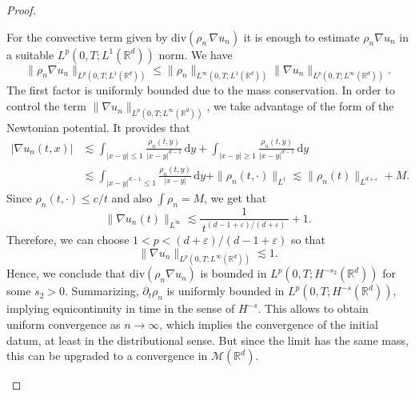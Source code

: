 \documentclass[11pt,a4paper]{article}
\numberwithin{equation}{section}
\newcommand{\R}{{\mathbb{R}}}
\theoremstyle{plain}
\theoremstyle{remark}
\newcommand {\f}{\frac}
\newcommand {\Div}{ {\rm div} }
\begin{document}
\begin{proof}
\begin{enumeratesteps}
For the convective term given by $\mathrm{div}(\rho_n\,\nabla u_n)$ it is enough to estimate $\rho_n \nabla u_n$ in a suitable $L^p(0,T; L^1(\R^d))$ norm.  We have
\[
\|\rho_n\nabla u_n\|_{L^p(0,T;L^1(\mathbb{R}^d))}
   \le  
\|\rho_n\|_{L^\infty(0,T;L^1(\mathbb{R}^d))}  \|\nabla u_n\|_{L^p(0,T;L^\infty(\mathbb{R}^d))}.
\]
The first factor is uniformly bounded due to the mass conservation. In order to control the term $\|\nabla u_n\|_{L^p(0,T;L^\infty(\R^d))}$, we take advantage of the form of the Newtonian potential. It  provides that 
\begin{align*}
|\nabla u_n(t,x)|
 &  \lesssim   
\int_{|x-y|\le 1}\f{\rho_n(t,y)}{|x-y|^{d-1}}\,\mathrm{d}y
    +  
\int_{|x-y|\ge 1}\f{\rho_n(t,y)}{|x-y|^{d-1}}\,\mathrm{d}y\\
 &  \lesssim  
\int_{|x-y|^{d-1}\le 1}\!\f{\rho_n(t,y)}{|x-y|}\,\mathrm{d}y
    +  
\|\rho_n(t,\cdot)\|_{L^1}
   \lesssim  
\|\rho_n(t)\|_{L^{d+\varepsilon}} + M.
\end{align*}
Since $\rho_n(t,\cdot)\leq c/t$ and also $\int\rho_n=M$, we get that
\[
\|\nabla u_n(t)\|_{L^\infty}
   \lesssim  
\f{1}{\,t^{(d-1+\varepsilon)/(d+\varepsilon)}\,}   +  1.
\]
Therefore, we can choose $1<p<(d+\varepsilon)/(d-1+\varepsilon)$ so that
\[
\|\nabla u_n\|_{L^p(0,T;L^\infty(\R^d))}
   \lesssim   
1.
\]
Hence, we conclude that $\mathrm{div}(\rho_n \nabla u_n)$ is bounded in $L^p(0,T;H^{-s_2}(\mathbb{R}^d))$ for some $s_2>0$. Summarizing, $\partial_t\rho_n$ is uniformly bounded in $L^p(0,T;H^{-s}(\mathbb{R}^d))$, implying equicontinuity in time in the sense of $H^{-s}$. This allows to obtain uniform convergence as $n\to\infty$, which implies the convergence of the initial datum, at least in the distributional sense. But since the limit has the same mass, this can be upgraded to a convergence in $\mathcal{M}(\R^d)$.\qedhere
%
%
%

\end{enumeratesteps}
\end{proof}
\end{document}
